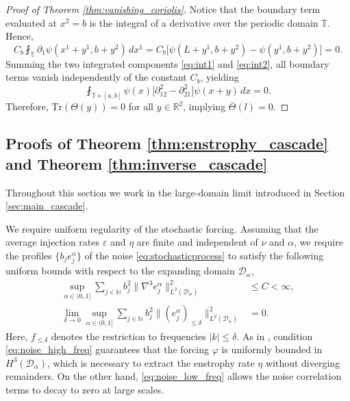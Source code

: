 \documentclass[11pt,a4paper]{article}
\numberwithin{equation}{section}
\numberwithin{theorem}{section}
\numberwithin{remark}{section}
\numberwithin{definition}{section}
\begin{document}
\begin{proof}[Proof of Theorem \ref{thm:vanishing_coriolis}]
Notice that the boundary term evaluated at $x^2=b$ is the integral of a derivative over the periodic domain $\mathbb{T}$. Hence,
\begin{equation*}
    C_b \fint_{\mathbb{T}} \partial_1 \psi(x^1+y^1, b+y^2) \, dx^1 = C_b \big[ \psi(L+y^1, b+y^2) - \psi(y^1, b+y^2) \big] = 0.
\end{equation*}
Summing the two integrated components \eqref{eq:int1} and \eqref{eq:int2}, all boundary terms vanish independently of the constant $C_b$, yielding 
\begin{equation}\label{eq:coclusionvanish}
    \fint_{\mathbb{T} \times [a, b]} \psi(x) \big[ \partial_{12}^2 - \partial_{21}^2 \big] \psi(x+y) \, dx = 0.
\end{equation}
Therefore, $\text{Tr}(\varTheta(y)) = 0$ for all $y \in \mathbb{R}^2$, implying $\overline{\varTheta}(l) = 0$.
\end{proof}

\subsection{Proofs of Theorem \ref{thm:enstrophy_cascade} and Theorem \ref{thm:inverse_cascade}}\label{sec:thermodynamic}
Throughout this section we work in the large-domain limit introduced in Section \ref{sec:main_cascade}.

We require uniform regularity of the stochastic forcing. Assuming that the average injection rates $\varepsilon$ and $\eta$ are finite and independent of $\nu$ and $\alpha$, we require the profiles $\{b_je_j^\alpha\}$ of the noise \eqref{eq:stochasticprocess} to satisfy the following uniform bounds with respect to the expanding domain $\mathcal{D}_\alpha$,
\begin{align}
    \sup_{\alpha \in (0,1]} \sum_{j \in \mathbb{N}}b_j^2 \|\nabla^3 e_j^\alpha\|_{L^2(\mathcal{D}_\alpha)}^2 &\le C < \infty, \label{eq:noise_high_freq} \\
    \lim_{\delta \to 0} \sup_{\alpha \in (0,1]} \sum_{j \in \mathbb{N}} b_j^2 \|(e_j^\alpha)_{\le \delta}\|_{L^2(\mathcal{D}_\alpha)}^2 &= 0.\label{eq:noise_low_freq}
\end{align}
Here, $f_{\le \delta}$ denotes the restriction to frequencies $|k| \le \delta$. As in \cite{bed2D}, condition \eqref{eq:noise_high_freq} guarantees that the forcing $\varphi$ is uniformly bounded in $H^3(\mathcal{D}_\alpha)$, which is necessary to extract the enstrophy rate $\eta$ without diverging remainders. On the other hand, \eqref{eq:noise_low_freq} allows the noise correlation terms to decay to zero at large scales.
\end{document}
